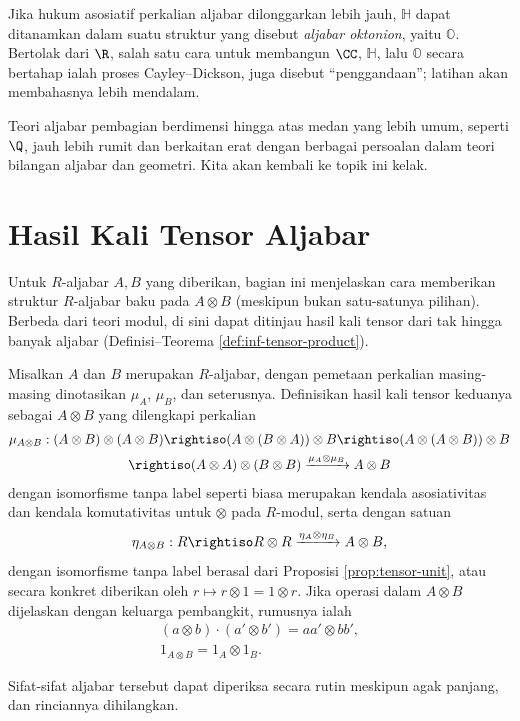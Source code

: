 Jika hukum asosiatif perkalian aljabar dilonggarkan lebih jauh, $\mathbb{H}$ dapat ditanamkan dalam suatu struktur yang disebut \emph{aljabar oktonion}, yaitu $\mathbb{O}$. Bertolak dari $\R$, salah satu cara untuk membangun $\CC$, $\mathbb{H}$, lalu $\mathbb{O}$ secara bertahap ialah proses Cayley--Dickson, juga disebut ``penggandaan''; latihan akan membahasnya lebih mendalam. 

Teori aljabar pembagian berdimensi hingga atas medan yang lebih umum, seperti $\Q$, jauh lebih rumit dan berkaitan erat dengan berbagai persoalan dalam teori bilangan aljabar dan geometri. Kita akan kembali ke topik ini kelak.

\section{Hasil Kali Tensor Aljabar}\label{sec:algebra-tensor-product}
Untuk $R$-aljabar $A, B$ yang diberikan, bagian ini menjelaskan cara memberikan struktur $R$-aljabar baku pada $A \otimes B$ (meskipun bukan satu-satunya pilihan). Berbeda dari teori modul, di sini dapat ditinjau hasil kali tensor dari tak hingga banyak aljabar (Definisi--Teorema \ref{def:inf-tensor-product}). 

\begin{definition}
	Misalkan $A$ dan $B$ merupakan $R$-aljabar, dengan pemetaan perkalian masing-masing dinotasikan $\mu_A$, $\mu_B$, dan seterusnya. Definisikan hasil kali tensor keduanya sebagai $A \otimes B$ yang dilengkapi perkalian
	\begin{multline*}
		\mu_{A \otimes B}: (A \otimes B) \otimes (A \otimes B) \rightiso (A \otimes (B \otimes A)) \otimes B \rightiso (A \otimes (A \otimes B)) \otimes B \\
		\rightiso (A \otimes A) \otimes (B \otimes B) \xrightarrow{\mu_A \otimes \mu_B} A \otimes B
	\end{multline*}
	dengan isomorfisme tanpa label seperti biasa merupakan kendala asosiativitas dan kendala komutativitas untuk $\otimes$ pada $R$-modul, serta dengan satuan
	\[ \eta_{A \otimes B}: R \rightiso R \otimes R \xrightarrow{\eta_A \otimes \eta_B} A \otimes B, \]
	dengan isomorfisme tanpa label berasal dari Proposisi \ref{prop:tensor-unit}, atau secara konkret diberikan oleh $r \mapsto r \otimes 1 = 1 \otimes r$. Jika operasi dalam $A \otimes B$ dijelaskan dengan keluarga pembangkit, rumusnya ialah
	\begin{gather*}
	(a \otimes b) \cdot (a' \otimes b') = aa' \otimes bb', \\
	1_{A \otimes B} = 1_A \otimes 1_B.
	\end{gather*}
\end{definition}
Sifat-sifat aljabar tersebut dapat diperiksa secara rutin meskipun agak panjang, dan rinciannya dihilangkan.

